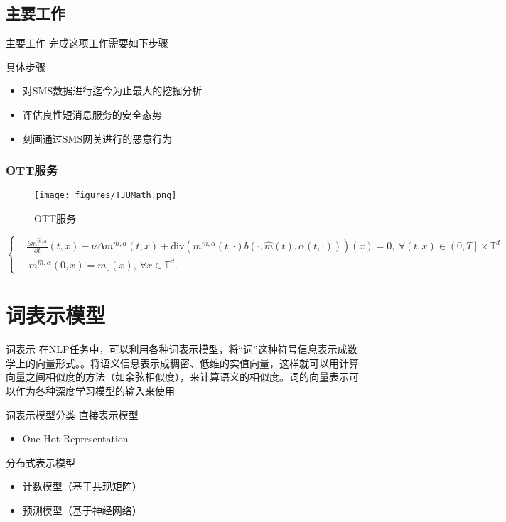 \documentclass[10pt,aspectratio=43,table,fontset=none]{beamer}
\begin{document}
\subsection{主要工作}
\begin{frame}{主要工作}
完成这项工作需要如下步骤
\begin{block}{具体步骤}
\begin{itemize}
	\item<0->  对SMS数据进行迄今为止最大的挖掘分析
	\item<0->  评估良性短消息服务的安全态势
	\item<0->  刻画通过SMS网关进行的恶意行为
\end{itemize}
\end{block}
\end{frame}

 \begin{frame}
\frametitle{OTT服务}
\begin{figure}[!t]
	\centering
	\texttt{[image: figures/TJUMath.png]}
	\caption{OTT服务}
	\label{figure3_OTT}
\end{figure}
\begin{equation}
	\left\{
	\begin{aligned}
		&\frac{\partial m^{\hat{m},\alpha}}{\partial t}(t,x)-\nu\Delta m^{\hat{m},\alpha}(t,x)+\text{div} \left(m^{\hat{m},\alpha}(t,\cdot)b(\cdot,\hat{m}(t),\alpha(t,\cdot))\right)(x)=0,\ \forall(t,x)\in\left(0,T\right]\times\mathbb{T}^d\\
		&\ m^{\hat{m},\alpha}(0,x)=m_0(x),\ \forall x\in\mathbb{T}^d.
	\end{aligned}
	\right.\label{3-1}
\end{equation}

\end{frame}



\section{词表示模型}  %

\begin{frame}{词表示}
在NLP任务中，可以利用各种词表示模型，将“词”这种符号信息表示成数学上的向量形式。。将语义信息表示成稠密、低维的实值向量，这样就可以用计算向量之间相似度的方法（如余弦相似度），来计算语义的相似度。词的向量表示可以作为各种深度学习模型的输入来使用
\begin{block}{词表示模型分类}
	直接表示模型
	\begin{itemize}
		\item<0-> One-Hot Representation
	\end{itemize}
	
	分布式表示模型
	\begin{itemize}
		\item<0-> 计数模型（基于共现矩阵）
		\item<0-> 预测模型（基于神经网络）
	\end{itemize}
\end{block}
\end{frame}
\end{document}
